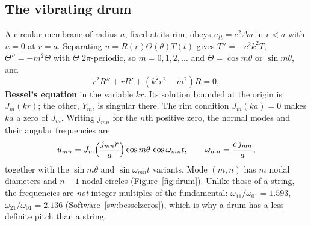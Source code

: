 \documentclass[11pt,a4paper]{article}
\numberwithin{equation}{section}
\theoremstyle{definition}
\begin{document}
\subsection{The vibrating drum}
\label{ssec:drum}

A circular membrane of radius $a$, fixed at its rim, obeys $u_{tt} = c^2\Delta u$ in $r < a$ with $u = 0$ at $r = a$. Separating $u = R(r)\Theta(\theta)T(t)$ gives $T'' = -c^2k^2T$, $\Theta'' = -m^2\Theta$ with $\Theta$ $2\pi$-periodic, so $m = 0, 1, 2, \ldots$ and $\Theta = \cos m\theta$ or $\sin m\theta$, and
\[
r^2R'' + rR' + (k^2r^2 - m^2)R = 0 ,
\]
\textbf{Bessel's equation} in the variable $kr$. Its solution bounded at the origin is $J_m(kr)$; the other, $Y_m$, is singular there. The rim condition $J_m(ka) = 0$ makes $ka$ a zero of $J_m$. Writing $j_{mn}$ for the $n$th positive zero, the normal modes and their angular frequencies are
\[
u_{mn} = J_m\Bigl(\frac{j_{mn}r}a\Bigr)\cos m\theta\,\cos\omega_{mn}t, \qquad \omega_{mn} = \frac{c\,j_{mn}}a ,
\]
together with the $\sin m\theta$ and $\sin\omega_{mn}t$ variants. Mode $(m, n)$ has $m$ nodal diameters and $n - 1$ nodal circles (Figure~\ref{fig:drum}). Unlike those of a string, the frequencies are \emph{not} integer multiples of the fundamental: $\omega_{11}/\omega_{01} = 1.593$, $\omega_{21}/\omega_{01} = 2.136$
(Software~\ref{sw:besselzeros}), which is why a drum has a less definite pitch than a string.
\end{document}
